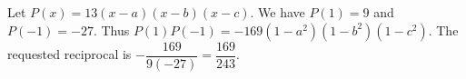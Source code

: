 Let $P(x)=13(x-a)(x-b)(x-c)$. We have $P(1)=9$ and $P(-1)=-27$. Thus $P(1)P(-1)=-169(1-a^2)(1-b^2)(1-c^2)$. The requested reciprocal is $-\dfrac{169}{9(-27)}=\boxed{\dfrac{169}{243}}$.
